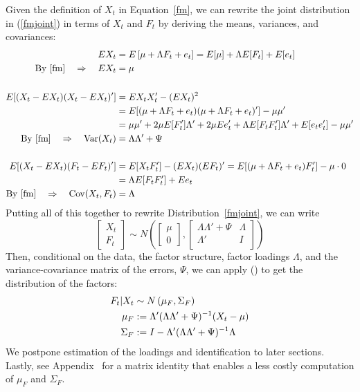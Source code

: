 \documentclass[12pt]{article}
\theoremstyle{plain}
\theoremstyle{definition}
\theoremstyle{remark}
\begin{document}
Given the definition of $X_t$ in Equation~\ref{fm}, we can rewrite the
joint distribution in (\ref{fmjoint}) in terms of $X_t$ and $F_t$ by
deriving the means, variances, and covariances:
\begin{align*}
  EX_t &= E\left[\mu + \Lambda F_t + e_t\right]
    = E[\mu] + \Lambda E[F_t] + E[e_t]\\
  \text{By~\ref{fm}} \quad\Rightarrow\quad
    EX_t &= \mu \\\\
  E[(X_t-EX_t)(X_t-EX_t)'] &= EX_tX_t' - (EX_t)^2\\
  &= E[(\mu+\Lambda F_t + e_t)(\mu+\Lambda F_t + e_t)'] - \mu\mu'\\
  &= \mu\mu' + 2\mu E[F'_t]\Lambda' + 2\mu Ee_t'
    + \Lambda E[F_tF'_t] \Lambda' + E[e_te_t'] - \mu\mu'\\
  \text{By~\ref{fm}} \quad\Rightarrow\quad
    \text{Var}(X_t)
    &= \Lambda \Lambda' + \Psi \\\\
  E[(X_t-EX_t)(F_t-EF_t)'] &=
    E[X_tF_t'] - (EX_t)(EF_t)' =
      E[(\mu+\Lambda F_t + e_t) F_t'] - \mu\cdot 0\\
    &= \Lambda E[F_tF_t'] + Ee_t\\
  \text{By~\ref{fm}} \quad\Rightarrow\quad
    \text{Cov}(X_t, F_t)
    &= \Lambda
\end{align*}
Putting all of this together to rewrite Distribution~\ref{fmjoint}, we
can write
\begin{equation}
  \begin{bmatrix} X_t \\ F_t \end{bmatrix} \sim
  N\left(
    \begin{bmatrix} \mu \\ 0 \end{bmatrix} ,
    \begin{bmatrix}
      \Lambda\Lambda' + \Psi & \Lambda \\
      \Lambda' & I \\
    \end{bmatrix}
    \right)
\end{equation}
Then, conditional on the data, the factor structure, factor loadings
$\Lambda$, and the variance-covariance matrix of the errors, $\Psi$, we
can apply () to get the distribution of the factors:
\begin{align}
  F_t|X_t &\sim N\left(\mu_F, \Sigma_F\right) \label{fgivenx}\\
  \mu_F &:= \Lambda'(\Lambda\Lambda'+\Psi)^{-1}(X_t-\mu) \notag\\
  \Sigma_F &:= I- \Lambda'(\Lambda\Lambda'+\Psi)^{-1}\Lambda \notag
\end{align}
We postpone estimation of the loadings and identification to later
sections. Lastly, see Appendix~ for a matrix identity that
enables a less costly computation of $\mu_F$ and $\Sigma_F$.
\end{document}

